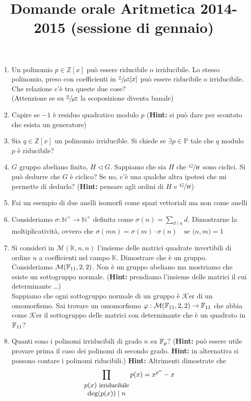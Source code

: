 \documentclass[a4paper,11pt]{article}
\title{Domande orale Aritmetica 2014-2015 (sessione di gennaio)}
\author{}
\newcommand{\su}[2]{\sfrac{#1}{#2}}
\newcommand{\PP}{\mathbb{P}}
\newcommand{\NN}{\mathbb{N}}
\newcommand{\KK}{\mathbb{K}}
\newcommand{\Nplus}{\NN^{+}}
\newcommand{\Mtr}[3]{\mathcal{M}(#1, #2, #3)}
\newcommand{\Zx}{\mathbb{Z}[x]}
\newcommand{\Zp}{\su{\mathbb{Z}}{p\mathbb{Z}}}
\newcommand{\Zpx}{\Zp [x]}
\newcommand{\Hint}{{\bf Hint: }}
\newcommand{\Ker}{\mathcal{K}\mbox{er} }
\newcommand{\MCD}[2]{\mathcal{(} #1 \mathcal{,} #2 \mathcal{)}}
\begin{document}
\maketitle

\begin{enumerate}
\item Un polinomio $p \in \Zx$ pu\`o essere riducibile o irriducibile. Lo stesso polinomio, preso con coefficienti in $\Zpx$ pu\`o essere riducibile o irriducibile. Che relazione c'\`e tra queste due cose? \\ (Attenzione se su $\Zp$ la scoposizione diventa banale)
\item Capire se $-1$ \`e residuo quadratico modulo $p$ (\Hint si pu\`o dare per scontato che esista un generatore)
\item Sia $q \in \Zx$ un polinomio irriducible. Si chiede se $\exists p \in \PP$ tale che $q$ modulo $p$ \`e riducibile?
\item $G$ gruppo abeliano finito, $H \lhd G$. Sappiamo che sia $H$ che $\su{G}{H}$ sono ciclici. Si pu\`o dedurre che $G$ \`e ciclico? Se no, c'\`e una qualche altra ipotesi che mi permette di dedurlo? (\Hint pensare agli ordini di $H$ e $\su{G}{H}$)
\item Fai un esempio di due anelli isomorfi come spazi vettoriali ma non come anelli
\item Consideriamo $\sigma : \Nplus \rightarrow \Nplus$ definita come $\sigma(n) = \sum_{d \mid n} d$. Dimostrarne la moltiplicativit\`a, ovvero che $\sigma(mn) = \sigma(m)\cdot\sigma(n) \quad \mbox{se } \MCD{n}{m}=1$
\item Si consideri in $\Mtr{\KK}{n}{n}$ l'insieme delle matrici quadrate invertibili di ordine $n$ a coefficienti nel campo $\KK$. Dimostrare che è un gruppo. \\ Consideriamo $\Mtr{\FF{11}}{2}{2}$. Non \`e un gruppo abeliano ma mostriamo che esiste un sottogruppo normale. (\Hint prendiamo l'insieme delle matrici il cui determinante \ldots) \\ Sappiamo che ogni sottogruppo normale di un gruppo \`e $\Ker$ di un omomorfismo. Sai trovare un omomorfismo $\varphi : \Mtr{\FF{11}}{2}{2}  \rightarrow \FF{11}$ che abbia come $\Ker$ il sottogruppo delle matrici con determinante che è un quadrato in $\FF{11}$?
\item Quanti sono i polinomi irriducibili di grado $n$ su $\FF{p}$? (\Hint pu\`o essere utile provare prima il caso dei polinomi di secondo grado. \Hint in alternativa si possono contare i polinomi riducibili.) \Hint Altrimenti dimostrate che $$\prod_{\begin{matrix} p(x) \mbox{ \small irriducibile} \\ \deg(p(x)) \mid n \end{matrix}} p(x) = x^{p^n}-x$$

\end{enumerate}
\end{document}
